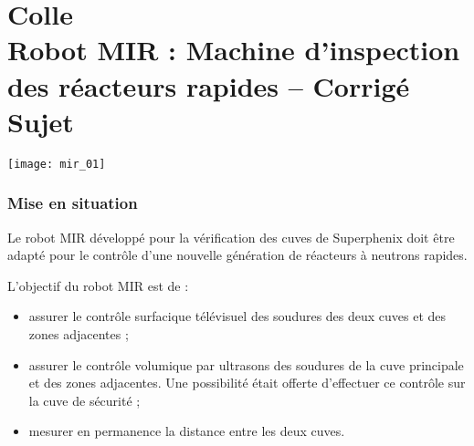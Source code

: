 \chapter*{Colle  \\
Robot MIR : Machine d'inspection des réacteurs rapides -- \ifprof Corrigé \else Sujet \fi}


\iflivret {} \else
\ifprof  {} \else \fi
\fi
\setcounter{question}{0}

\begin{marginfigure}
\texttt{[image: mir\_01]}
\end{marginfigure}


\subsection*{Mise en situation}

Le robot MIR développé pour la vérification des cuves de Superphenix doit être adapté pour le contrôle d’une nouvelle génération de réacteurs à neutrons rapides.

L’objectif du robot MIR est de :
\begin{itemize}
\item assurer le contrôle surfacique télévisuel des soudures des deux cuves et des zones adjacentes ;
\item assurer le contrôle volumique par ultrasons des soudures de la cuve principale et des zones adjacentes. Une possibilité était offerte d’effectuer ce contrôle sur la cuve de sécurité ;
\item mesurer en permanence la distance entre les deux cuves.
\end{itemize}


